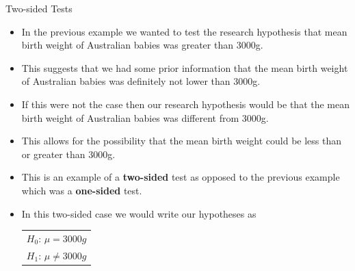 \documentclass[handout]{beamer}
\begin{document}
\begin{frame}[fragile]{Two-sided Tests}
\scriptsize{
\begin{itemize}
 \item In the previous example we wanted to test the research hypothesis that mean birth weight of Australian babies was greater than 3000g.
 \item This suggests that we had some prior information that the mean birth weight of Australian babies was definitely not lower than 3000g. 
 \item If this were not the case then our research hypothesis would be that the mean birth weight of Australian babies was different from 3000g. 
 \item This allows for the possibility that the mean birth weight could be less than or greater than 3000g.
 \item This is an example of a \textbf{two-sided} test as opposed to the previous example which was a \textbf{one-sided} test.
 
 \item In this two-sided case we would write our hypotheses as
 \begin{table}
\center
 \begin{tabular}{c}  
$H_0$: $\mu=3000g$ \\
$H_1$: $\mu\neq3000g$
\end{tabular} 
\end{table}
\end{itemize}
} 
\end{frame}
\end{document}
